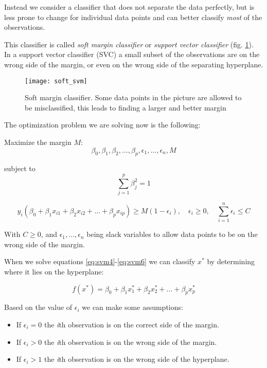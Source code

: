 Instead we consider a classifier that does not separate the data perfectly, but is less prone to change for individual data points and can better classify \textit{most} of the observations.

This classifier is called \textit{soft margin classifier} or \textit{support vector classifier} (fig. \ref{fig:soft_svm}). \\
In a support vector classifier (SVC) a small subset of the observations are on the wrong side of the margin, or even on the wrong side of the separating hyperplane.

\begin{figure}[H]
	\centering
	\texttt{[image: soft\_svm]}
	\caption{Soft margin classifier. Some data points in the picture are allowed to be misclassified, this leads to finding a larger and better margin \cite{soft_svm}}
	\label{fig:soft_svm}
\end{figure}

The optimization problem we are solving now is the following: 

Maximize the margin $M$:
\begin{equation} \label{eq:svm4}
\beta_0, \beta_1, \beta_2, \dots, \beta_p, \epsilon_1, \dots, \epsilon_n, M
\end{equation}

subject to
\begin{equation} \label{eq:svm5}
\sum_{j=1}^{p}\beta^2_j = 1
\end{equation}

\begin{equation} \label{eq:svm6}
y_i(\beta_0 + \beta_1 x_{i1} + \beta_2 x_{i2} + \dots + \beta_p x_{ip}) \ge M(1 - \epsilon_i), \quad \epsilon_i \ge 0, \quad \sum_{i=1}^{n}\epsilon_i \le C
\end{equation}

With $C \ge 0$, and $\epsilon_1, \dots, \epsilon_n$ being slack variables to allow data points to be on the wrong side of the margin.

When we solve equations \ref{eq:svm4}-\ref{eq:svm6} we can classify $x^*$ by determining where it lies on the hyperplane:

\begin{equation} \label{eq:svm7}
f(x^*) = \beta_0 + \beta_1 x_{1}^* + \beta_2 x_{2}^* + \dots + \beta_p x_{p}^*
\end{equation}

Based on the value of $\epsilon_i$ we can make some assumptions:
\begin{itemize}[noitemsep]
	\item If $\epsilon_i = 0$ the \textit{i}th observation is on the correct side of the margin.
	\item If $\epsilon_i > 0$ the \textit{i}th observation is on the wrong side of the margin.
	\item If $\epsilon_i > 1$ the \textit{i}th observation is on the wrong side of the hyperplane.
\end{itemize}

